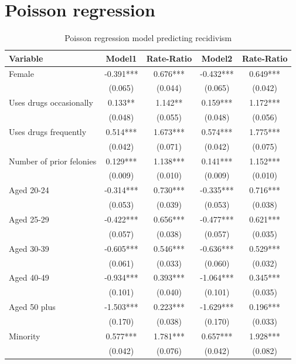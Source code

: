 \section{Poisson regression}

\begin{table}[htbp]\centering
 \caption{Poisson regression model predicting recidivism \label{tab:recdpois}}
 \begin{tabular}{lcccc}
\hline
Variable      &    Model1 & Rate-Ratio &    Model2 & Rate-Ratio  \\
\hline
Female   &   -0.391***&    0.676***&   -0.432***&    0.649***\\
      &   (0.065)  &   (0.044)  &   (0.065)  &   (0.042)  \\
Uses drugs occasionally   &    0.133** &    1.142** &    0.159***&    1.172***\\
      &   (0.048)  &   (0.055)  &   (0.048)  &   (0.056)  \\
Uses drugs frequently   &    0.514***&    1.673***&    0.574***&    1.775***\\
      &   (0.042)  &   (0.071)  &   (0.042)  &   (0.075)  \\
Number of prior felonies    &    0.129***&    1.138***&    0.141***&    1.152***\\
      &   (0.009)  &   (0.010)  &   (0.009)  &   (0.010)  \\
Aged 20-24   &   -0.314***&    0.730***&   -0.335***&    0.716***\\
      &   (0.053)  &   (0.039)  &   (0.053)  &   (0.038)  \\
Aged 25-29   &   -0.422***&    0.656***&   -0.477***&    0.621***\\
      &   (0.057)  &   (0.038)  &   (0.057)  &   (0.035)  \\
Aged 30-39   &   -0.605***&    0.546***&   -0.636***&    0.529***\\
      &   (0.061)  &   (0.033)  &   (0.060)  &   (0.032)  \\
Aged 40-49   &   -0.934***&    0.393***&   -1.064***&    0.345***\\
      &   (0.101)  &   (0.040)  &   (0.101)  &   (0.035)  \\
Aged 50 plus   &   -1.503***&    0.223***&   -1.629***&    0.196***\\
      &   (0.170)  &   (0.038)  &   (0.170)  &   (0.033)  \\
Minority    &    0.577***&    1.781***&    0.657***&    1.928***\\
      &   (0.042)  &   (0.076)  &   (0.042)  &   (0.082)  \\

\end{tabular}
\end{table}
